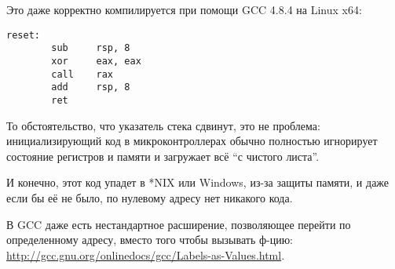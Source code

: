 Это даже корректно компилируется при помощи GCC 4.8.4 на Linux x64:

\begin{lstlisting}[style=customasmx86]
reset:
        sub     rsp, 8
        xor     eax, eax
        call    rax
        add     rsp, 8
        ret
\end{lstlisting}

То обстоятельство, что указатель стека сдвинут, это не проблема: инициализирующий код в микроконтроллерах обычно
полностью игнорирует состояние регистров и памяти и загружает всё ``с чистого листа''.

И конечно, этот код упадет в *NIX или Windows, из-за защиты памяти, и даже если бы её не было, по нулевому адресу
нет никакого кода.

В GCC даже есть нестандартное расширение, позволяющее перейти по определенному адресу, вместо того чтобы вызывать ф-цию:
\url{http://gcc.gnu.org/onlinedocs/gcc/Labels-as-Values.html}.


